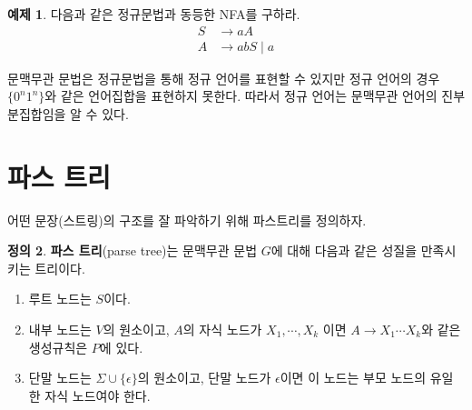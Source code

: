 \documentclass[b5paper, 10pt]{book}
\theoremstyle{definition}
\newtheorem{defn}{정의}[chapter]
\newtheorem{ex}[defn]{예제}
\begin{document}
\begin{ex}
   다음과 같은 정규문법과 동등한 NFA를 구하라.
   \begin{align*}
       S & \rightarrow aA \\ 
       A & \rightarrow abS \; \vert \; a 
   \end{align*} 
\end{ex}
\begin{figure}[!ht]
    \centering
    \caption{} 
    \label{regular grammar}
\end{figure}
문맥무관 문법은 정규문법을 통해 정규 언어를 표현할 수 있지만 
정규 언어의 경우 $\{0^n1^n\}$와 같은 언어집합을 표현하지 못한다. 
따라서 정규 언어는 문맥무관 언어의 진부분집합임을 알 수 있다. 
\section{파스 트리}
어떤 문장(스트링)의 구조를 잘 파악하기 위해 파스트리를 정의하자.
\begin{defn}
    \textbf{파스 트리}(parse tree)는 문맥무관 문법 $G$에 대해 다음과 같은 성질을
    만족시키는 트리이다.
    \begin{enumerate}
        \item 루트 노드는 $S$이다.
        \item 내부 노드는 $V$의 원소이고, $A$의 자식 노드가 
        $X_1, \cdots, X_k $ 이면
        $A \rightarrow X_1 \cdots X_k$와 같은 생성규칙은 $P$에 있다. 
        \item 단말 노드는 $\Sigma \cup \{\epsilon\}$의 원소이고, 단말 노드가 $\epsilon$이면
        이 노드는 부모 노드의 유일한 자식 노드여야 한다. 
    \end{enumerate}
\end{defn}
\end{document}
